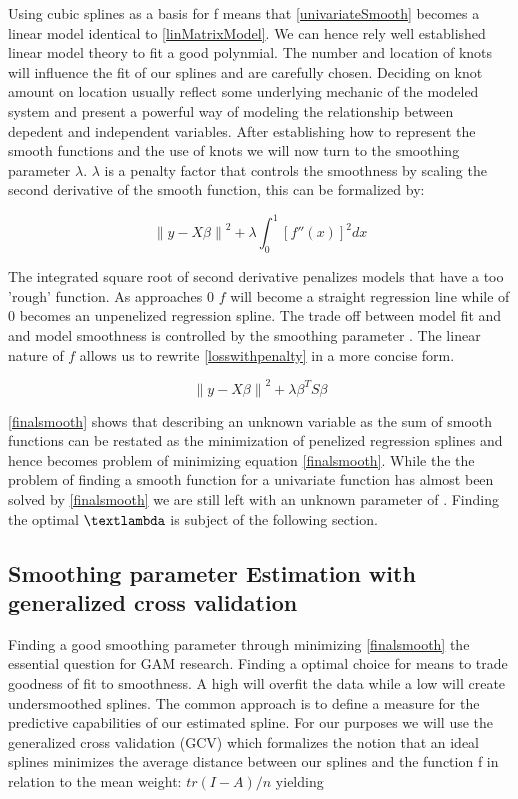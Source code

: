 \documentclass{article}
\begin{document}
    Using cubic splines as a basis for f means that \ref{univariateSmooth} becomes a linear model identical to \ref{linMatrixModel}. We can hence rely well established linear model theory to fit a good polynmial. The number and location of knots will influence the fit of our splines and are carefully chosen. Deciding on knot amount on location usually reflect some underlying mechanic of the modeled system and present a powerful way of modeling the relationship between depedent and independent variables. After establishing how to represent the smooth functions and the use of knots we will now turn to the smoothing parameter $\lambda$. $\lambda$ is a penalty factor that controls the smoothness by scaling the second derivative of the smooth function, this can be formalized by:

    \begin{equation} \label{losswithpenalty} \left \| y - X\beta  \right \|^2 + \lambda \int_{0}^{1} [{f}''(x)]^2 dx \end{equation}

    The integrated square root of second derivative penalizes models that have a too 'rough' function. As \textlambda approaches 0 $f$ will become a straight regression line while \textlambda of 0 becomes an unpenelized regression spline. The trade off between model fit and and model smoothness is controlled by the smoothing parameter \textlambda. The linear nature of $f$ allows us to rewrite \ref{losswithpenalty} in a more concise form.

    \begin{equation} \label{finalsmooth} \left \| y - X\beta  \right \|^2 + \lambda \beta^T S\beta  \end{equation}

    \ref{finalsmooth} shows that describing an unknown variable as the sum of smooth functions can be restated as the minimization of penelized regression splines and hence becomes problem of minimizing equation \ref{finalsmooth}. While the the problem of finding a smooth function for a univariate function has almost been solved by \ref{finalsmooth} we are still left with an unknown parameter of \textlambda. Finding the optimal $\textlambda$ is subject of the following section.

    \subsection{Smoothing parameter Estimation with generalized cross validation}
    Finding a good smoothing parameter through minimizing \ref{finalsmooth} the essential question for GAM research. Finding a optimal choice for \textlambda means to trade goodness of fit to smoothness. A high \textlambda will overfit the data while a low \textlambda will create undersmoothed splines. The common approach is to define a measure for the predictive capabilities of our estimated spline. For our purposes we will use the generalized cross validation (GCV) which formalizes the notion that an ideal splines minimizes the average distance between our splines and the function f in relation to the mean weight: $tr(I-A)/n$ yielding
\end{document}

